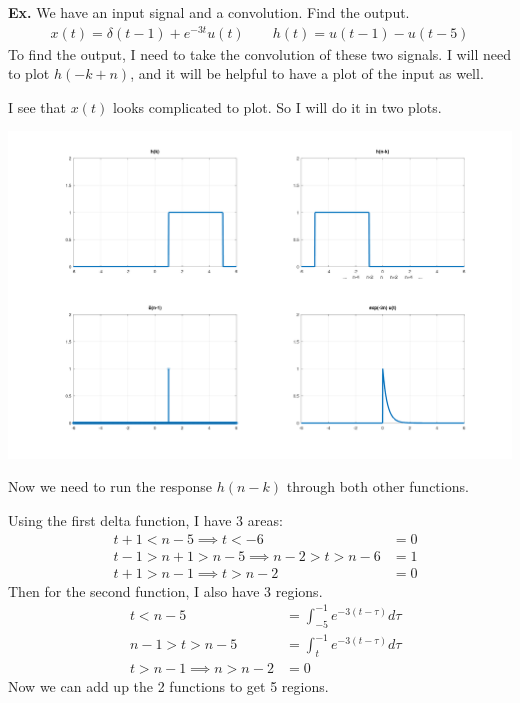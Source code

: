 \documentclass[12pt,letterpaper]{article} \usepackage{amsmath} \usepackage{graphicx} \usepackage[margin=1in]{geometry} \usepackage{longtable}  \usepackage{amssymb}
\begin{document}
	\begin{mdframed}
		\textbf{Ex. } We have an input signal and a convolution. Find the output.
		\begin{align*}
			x(t) = \delta (t-1) + e^{-3t} u(t) \qquad h(t) = u(t-1) - u(t-5)
		\end{align*}
		To find the output, I need to take the convolution of these two signals. I will need to plot $h(-k+n)$, and it will be helpful to have a plot of the input as well.
		
		I see that $x(t)$ looks complicated to plot. So I will do it in two plots. 
		
		\centering
		\includegraphics[width=0.99\linewidth]{images/ex3}

		\raggedright
			
		Now we need to run the response $h(n-k)$ through both other functions.
		
		Using the first delta function, I have 3 areas:
		\begin{align*}
			&t+1 < n-5 \implies t<-6 & =0\\
			&t-1 > n+1 > n-5 \implies n-2 > t > n-6 & =1\\
			&t+1 > n-1 \implies t > n-2 & =0
		\end{align*}
		Then for the second function, I also have 3 regions. 
		\begin{align*}
			&t < n-5 & = \int_{-5}^{-1}e^{-3(t-\tau)}d\tau\\
			&n-1 > t > n-5  & =\int_{t}^{-1} e^{-3(t-\tau)}d\tau\\
			&t > n-1 \implies n > n-2 & =0
		\end{align*}
		Now we can add up the 2 functions to get 5 regions. 
	\end{mdframed}
	
\end{document}

